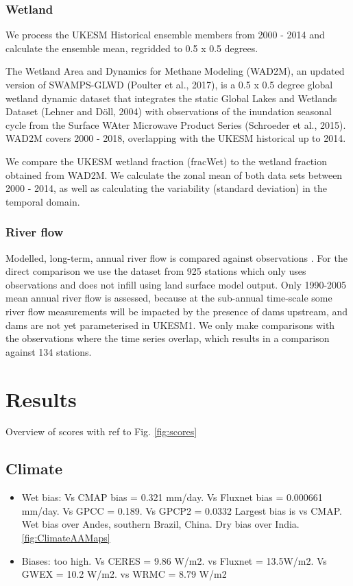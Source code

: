 \documentclass[bg, manuscript]{copernicus}
\begin{document}
\subsubsection{Wetland}
We process the UKESM Historical ensemble members from 2000 - 2014 and calculate the ensemble mean, regridded to 0.5 x 0.5 degrees.

The Wetland Area and Dynamics for Methane Modeling (WAD2M), an updated version of SWAMPS-GLWD (Poulter et al., 2017), is a 0.5 x 0.5 degree global wetland dynamic dataset that integrates the static Global Lakes and Wetlands Dataset (Lehner and Döll, 2004) with observations of the inundation seasonal cycle from the Surface WAter Microwave Product Series (Schroeder et al., 2015). WAD2M covers 2000 - 2018, overlapping with the UKESM historical up to 2014.

We compare the UKESM wetland fraction (fracWet) to the wetland fraction obtained from WAD2M. We calculate the zonal mean of both data sets between 2000 - 2014, as well as calculating the variability (standard deviation) in the temporal domain.

\subsubsection{River flow}
Modelled, long-term, annual river flow is compared against observations \citep{Dai2009}. For the direct comparison we use the \citep{Dai2009} dataset from 925 stations which only uses observations and does not infill using land surface model output. Only 1990-2005 mean annual river flow is assessed, because at the sub-annual time-scale some river flow measurements will be impacted by the presence of dams upstream, and dams are not yet parameterised in UKESM1. We only make comparisons with the observations where the time series overlap, which results in a comparison against 134 stations. 

\section{Results}

Overview of scores with ref to Fig. \ref{fig:scores}

\subsection{Climate}

\begin{itemize}
    \item{Wet bias: Vs CMAP bias = 0.321 mm/day. Vs Fluxnet bias = 0.000661 mm/day. Vs GPCC = 0.189. Vs GPCP2 = 0.0332
Largest bias is vs CMAP. Wet bias over Andes, southern Brazil, China. Dry bias over India. \ref{fig:ClimateAAMaps}}
    \item Biases: too high. Vs CERES = 9.86 W/m2. vs Fluxnet = 13.5W/m2. Vs GWEX = 10.2 W/m2. vs WRMC = 8.79 W/m2
\end{itemize}
\end{document}
